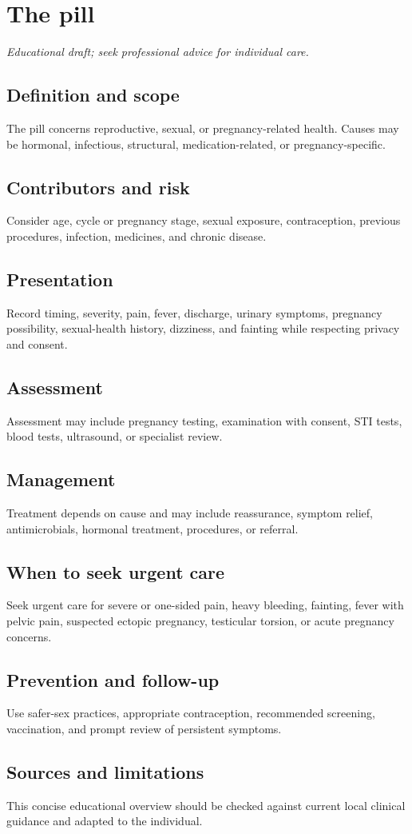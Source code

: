 \chapter{The pill}
\medskip
\noindent\textit{Educational draft; seek professional advice for individual care.}

\section*{Definition and scope}
The pill concerns reproductive, sexual, or pregnancy-related health. Causes may be hormonal, infectious, structural, medication-related, or pregnancy-specific.

\section*{Contributors and risk}
Consider age, cycle or pregnancy stage, sexual exposure, contraception, previous procedures, infection, medicines, and chronic disease.

\section*{Presentation}
Record timing, severity, pain, fever, discharge, urinary symptoms, pregnancy possibility, sexual-health history, dizziness, and fainting while respecting privacy and consent.

\section*{Assessment}
Assessment may include pregnancy testing, examination with consent, STI tests, blood tests, ultrasound, or specialist review.

\section*{Management}
Treatment depends on cause and may include reassurance, symptom relief, antimicrobials, hormonal treatment, procedures, or referral.

\section*{When to seek urgent care}
Seek urgent care for severe or one-sided pain, heavy bleeding, fainting, fever with pelvic pain, suspected ectopic pregnancy, testicular torsion, or acute pregnancy concerns.

\section*{Prevention and follow-up}
Use safer-sex practices, appropriate contraception, recommended screening, vaccination, and prompt review of persistent symptoms.

\section*{Sources and limitations}
This concise educational overview should be checked against current local clinical guidance and adapted to the individual.
